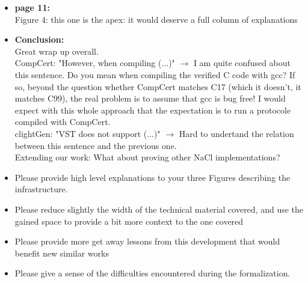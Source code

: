 \begin{itemize}
  \item \textbf{page 11:}\\
    Figure 4: this one is the apex: it would deserve a full column of explanations
\end{itemize}
\begin{answer}
\end{answer}

\begin{itemize}
  \item \textbf{Conclusion:}\\
    Great wrap up overall.\\
    CompCert: "However, when compiling (...)" $\rightarrow$ I am quite confused about this sentence. Do you mean when compiling the verified C code with gcc? If so, beyond the question whether CompCert matches C17 (which it doesn't, it matches C99), the real problem is to assume that gcc is bug free! I would expect with this whole approach that the expectation is to run a protocole compiled with CompCert.\\
    clightGen: "VST does not support (...)" $\rightarrow$ Hard to undertand the relation between this sentence and the previous one.\\
    Extending our work: What about proving other NaCl implementations?
\end{itemize}

\begin{answer}
\end{answer}

\begin{center}
\end{center}
\begin{itemize}
  \item Please provide high level explanations to your three Figures describing the infrastructure.
  \item Please reduce slightly the width of the technical material covered, and use the gained space to provide a bit more context to the one covered
  \item Please provide more get away lessons from this development that would benefit new similar works
  \item Please give a sense of the difficulties encountered during the formalization.
\end{itemize}

